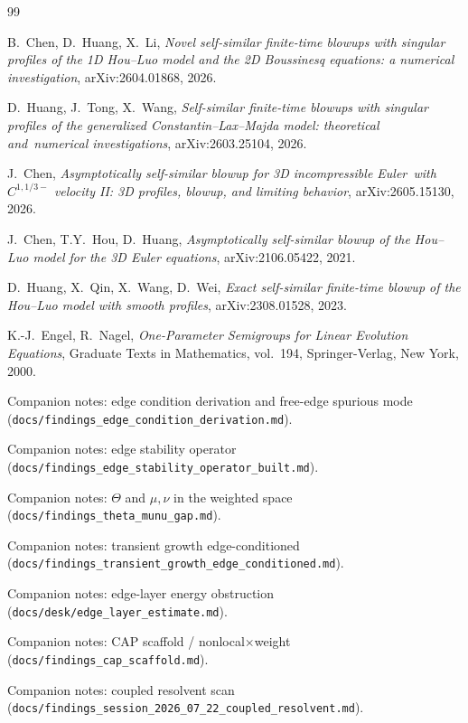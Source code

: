 \documentclass[11pt,a4paper]{article}
\begin{document}
\begin{thebibliography}{99}

B.~Chen, D.~Huang, X.~Li,
\textit{Novel self-similar finite-time blowups with singular profiles of the 1D
Hou--Luo model and the 2D Boussinesq equations: a numerical investigation},
arXiv:2604.01868, 2026.

D.~Huang, J.~Tong, X.~Wang,
\textit{Self-similar finite-time blowups with singular profiles of the generalized
Constantin--Lax--Majda model: theoretical and\allowbreak\ numerical investigations},
arXiv:2603.25104, 2026.

J.~Chen,
\textit{Asymptotically self-similar blowup for 3D incompressible Euler\allowbreak\ with
$C^{1,1/3-}$ velocity II: 3D profiles, blowup, and limiting behavior},
arXiv:2605.15130, 2026.

J.~Chen, T.Y.~Hou, D.~Huang,
\textit{Asymptotically self-similar blowup of the Hou--Luo model for the 3D Euler
equations}, arXiv:2106.05422, 2021.

D.~Huang, X.~Qin, X.~Wang, D.~Wei,
\textit{Exact self-similar finite-time blowup of the Hou--Luo model with smooth profiles},
arXiv:2308.01528, 2023.

K.-J.~Engel, R.~Nagel,
\textit{One-Parameter Semigroups for Linear Evolution Equations},
Graduate Texts in Mathematics, vol.~194, Springer-Verlag, New York, 2000.

Companion notes: edge condition derivation and free-edge spurious mode
(\texttt{docs/findings\_edge\_condition\_derivation.md}).

Companion notes: edge stability operator
(\texttt{docs/findings\_edge\_stability\_\allowbreak operator\_built.md}).

Companion notes: $\Theta$ and $\mu,\nu$ in the weighted space
(\texttt{docs/findings\_theta\_munu\_gap.md}).

Companion notes: transient growth edge-conditioned
(\texttt{docs/findings\_transient\_growth\_\allowbreak edge\_conditioned.md}).

Companion notes: edge-layer energy obstruction
(\texttt{docs/desk/edge\_layer\_estimate.md}).

Companion notes: CAP scaffold / nonlocal$\times$weight
(\texttt{docs/findings\_cap\_scaffold.md}).

Companion notes: coupled resolvent scan
(\texttt{docs/findings\_session\_2026\_07\_22\_\allowbreak coupled\_resolvent.md}).

\end{thebibliography}
\end{document}
